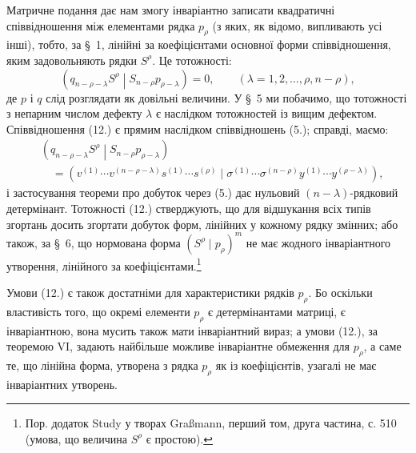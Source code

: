 \documentclass[11pt]{article}
\newcommand{\pair}[2]{\left(#1\middle|#2\right)}
\begin{document}
Матричне подання дає нам змогу інваріантно записати квадратичні співвідношення між елементами рядка $p_\rho$ (з яких, як відомо, випливають усі інші), тобто, за \S\ 1, лінійні за коефіцієнтами основної форми співвідношення, яким задовольняють рядки $S^\rho$. Це тотожності:
\begin{equation}
 \pair{q_{n-\rho-\lambda}S^\rho}{S_{n-\rho}p_{\rho-\lambda}}=0,
 \qquad (\lambda=1,2,\ldots,\rho,n-\rho),
\tag{12}
\end{equation}
де $p$ і $q$ слід розглядати як довільні величини. У \S\ 5 ми побачимо, що тотожності з непарним числом дефекту $\lambda$ є наслідком тотожностей із вищим дефектом. Співвідношення (12.) є прямим наслідком співвідношень (5.); справді, маємо:
\[
\begin{aligned}
&\pair{q_{n-\rho-\lambda}S^\rho}{S_{n-\rho}p_{\rho-\lambda}}\\
&\quad
=(v^{(1)}\cdots v^{(n-\rho-\lambda)}s^{(1)}\cdots s^{(\rho)}
\mid \sigma^{(1)}\cdots\sigma^{(n-\rho)}y^{(1)}\cdots y^{(\rho-\lambda)}),
\end{aligned}
\]
і застосування теореми про добуток через (5.) дає нульовий $(n-\lambda)$-рядковий детермінант. Тотожності (12.) стверджують, що для відшукання всіх типів згортань досить згортати добуток форм, лінійних у кожному рядку змінних; або також, за \S\ 6, що нормована форма $(S^\rho\mid p_\rho)^m$ не має жодного інваріантного утворення, лінійного за коефіцієнтами.\footnote{Пор. додаток Study у творах Graßmann, перший том, друга частина, с. 510 (умова, що величина $S^\rho$ є простою).}

Умови (12.) є також достатніми для характеристики рядків $p_\rho$. Бо оскільки властивість того, що окремі елементи $p_\rho$ є детермінантами матриці, є інваріантною, вона мусить також мати інваріантний вираз; а умови (12.), за теоремою VI, задають найбільше можливе інваріантне обмеження для $p_\rho$, а саме те, що лінійна форма, утворена з рядка $p_\rho$ як із коефіцієнтів, узагалі не має інваріантних утворень.
\end{document}
